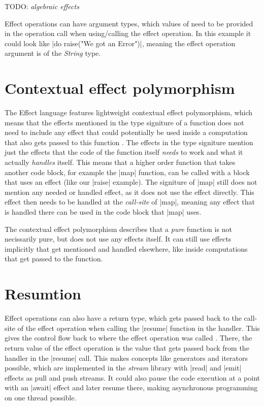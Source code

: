 TODO: \textit{algebraic effects}

Effect operations can have argument types, which values of need to be provided in the operation call when using/calling the effect operation. In this example it could look like |do raise("We got an Error")|, meaning the effect operation argument is of the \textit{String} type.

\section{Contextual effect polymorphism}

The Effect language features lightweight contextual effect polymorphism, which means that the effects mentioned in the type signiture of a function does not need to include any effect that could potentially be used inside a computation that also gets passed to this function \cite{brachthauser2020effects}. The effects in the type signiture mention just the effects that the code of the function itself \textit{needs} to work and what it actually \textit{handles} itself. This means that a higher order function that takes another code block, for example the |map| function, can be called with a block that uses an effect (like our |raise| example). The signiture of |map| still does not mention any needed or handled effect, as it does not use the effect directly. This effect then needs to be handled at the \textit{call-site} of |map|, meaning any effect that is handled there can be used in the code block that |map| uses.

The contextual effect polymorphism describes that a \textit{pure} function is not necissarily pure, but does not use any effects itself. It can still use effects implicitly that get mentioned and handled elsewhere, like inside computations that get passed to the function.

\section{Resumtion}

Effect operations can also have a return type, which gets passed back to the call-site of the effect operation when calling the |resume| function in the handler. This gives the control flow back to where the effect operation was called \cite{brachthauser2020effects}. There, the return value of the effect operation is the value that gets passed back from the handler in the |resume| call. This makes concepts like generators and iterators possible, which are implemented in the \textit{stream} library with |read| and |emit| effects as pull and push streams. It could also pause the code execution at a point with an |await| effect and later resume there, making asynchronous programming on one thread possible.

